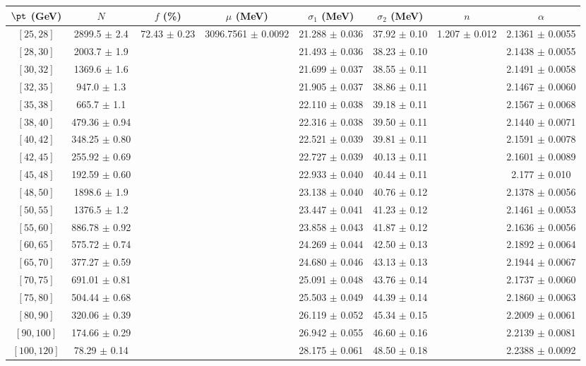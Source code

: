 \begin{tabular}{c||c|c|c|c|c|c|c}
$\pt$ (GeV) & $N$ & $f$ (\%) & $\mu$ (MeV) & $\sigma_1$ (MeV) & $\sigma_2$ (MeV) & $n$ & $\alpha$ \\
\hline
$[25, 28]$ & 2899.5 $\pm$ 2.4 & \multirow{19}{*}{72.43 $\pm$ 0.23} & \multirow{19}{*}{3096.7561 $\pm$ 0.0092} & 21.288 $\pm$ 0.036 & 37.92 $\pm$ 0.10 & \multirow{19}{*}{1.207 $\pm$ 0.012} & 2.1361 $\pm$ 0.0055\\
$[28, 30]$ & 2003.7 $\pm$ 1.9 &  &  & 21.493 $\pm$ 0.036 & 38.23 $\pm$ 0.10 &  & 2.1438 $\pm$ 0.0055\\
$[30, 32]$ & 1369.6 $\pm$ 1.6 &  &  & 21.699 $\pm$ 0.037 & 38.55 $\pm$ 0.11 &  & 2.1491 $\pm$ 0.0058\\
$[32, 35]$ & 947.0 $\pm$ 1.3 &  &  & 21.905 $\pm$ 0.037 & 38.86 $\pm$ 0.11 &  & 2.1467 $\pm$ 0.0060\\
$[35, 38]$ & 665.7 $\pm$ 1.1 &  &  & 22.110 $\pm$ 0.038 & 39.18 $\pm$ 0.11 &  & 2.1567 $\pm$ 0.0068\\
$[38, 40]$ & 479.36 $\pm$ 0.94 &  &  & 22.316 $\pm$ 0.038 & 39.50 $\pm$ 0.11 &  & 2.1440 $\pm$ 0.0071\\
$[40, 42]$ & 348.25 $\pm$ 0.80 &  &  & 22.521 $\pm$ 0.039 & 39.81 $\pm$ 0.11 &  & 2.1591 $\pm$ 0.0078\\
$[42, 45]$ & 255.92 $\pm$ 0.69 &  &  & 22.727 $\pm$ 0.039 & 40.13 $\pm$ 0.11 &  & 2.1601 $\pm$ 0.0089\\
$[45, 48]$ & 192.59 $\pm$ 0.60 &  &  & 22.933 $\pm$ 0.040 & 40.44 $\pm$ 0.11 &  & 2.177 $\pm$ 0.010\\
$[48, 50]$ & 1898.6 $\pm$ 1.9 &  &  & 23.138 $\pm$ 0.040 & 40.76 $\pm$ 0.12 &  & 2.1378 $\pm$ 0.0056\\
$[50, 55]$ & 1376.5 $\pm$ 1.2 &  &  & 23.447 $\pm$ 0.041 & 41.23 $\pm$ 0.12 &  & 2.1461 $\pm$ 0.0053\\
$[55, 60]$ & 886.78 $\pm$ 0.92 &  &  & 23.858 $\pm$ 0.043 & 41.87 $\pm$ 0.12 &  & 2.1636 $\pm$ 0.0056\\
$[60, 65]$ & 575.72 $\pm$ 0.74 &  &  & 24.269 $\pm$ 0.044 & 42.50 $\pm$ 0.13 &  & 2.1892 $\pm$ 0.0064\\
$[65, 70]$ & 377.27 $\pm$ 0.59 &  &  & 24.680 $\pm$ 0.046 & 43.13 $\pm$ 0.13 &  & 2.1944 $\pm$ 0.0067\\
$[70, 75]$ & 691.01 $\pm$ 0.81 &  &  & 25.091 $\pm$ 0.048 & 43.76 $\pm$ 0.14 &  & 2.1737 $\pm$ 0.0060\\
$[75, 80]$ & 504.44 $\pm$ 0.68 &  &  & 25.503 $\pm$ 0.049 & 44.39 $\pm$ 0.14 &  & 2.1860 $\pm$ 0.0063\\
$[80, 90]$ & 320.06 $\pm$ 0.39 &  &  & 26.119 $\pm$ 0.052 & 45.34 $\pm$ 0.15 &  & 2.2009 $\pm$ 0.0061\\
$[90, 100]$ & 174.66 $\pm$ 0.29 &  &  & 26.942 $\pm$ 0.055 & 46.60 $\pm$ 0.16 &  & 2.2139 $\pm$ 0.0081\\
$[100, 120]$ & 78.29 $\pm$ 0.14 &  &  & 28.175 $\pm$ 0.061 & 48.50 $\pm$ 0.18 &  & 2.2388 $\pm$ 0.0092\\
\end{tabular}
